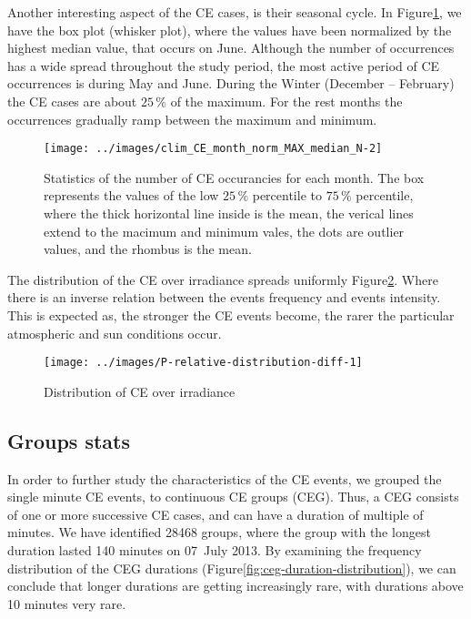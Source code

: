\documentclass[preprint, 3p,
authoryear]{elsarticle} %
\begin{document}
Another interesting aspect of the CE cases, is their seasonal cycle. In
Figure\nobreakspace{}\ref{fig:relative-month-occurancies}, we have the
box plot (whisker plot), where the values have been normalized by the
highest median value, that occurs on June. Although the number of
occurrences has a wide spread throughout the study period, the most
active period of CE occurrences is during May and June. During the
Winter (December -- February) the CE cases are about \(25\,\%\) of the
maximum. For the rest months the occurrences gradually ramp between the
maximum and minimum.

\begin{figure}

{\centering \texttt{[image: ../images/clim\_CE\_month\_norm\_MAX\_median\_N-2]} 

}

\caption{Statistics of the number of CE occurancies for each month. The box represents the values of the low $25\,\%$ percentile to $75\,\%$ percentile, where the thick horizontal line inside is the mean, the verical lines extend to the macimum and minimum vales, the dots are outlier values, and the rhombus is the mean.}\label{fig:relative-month-occurancies}
\end{figure}

The distribution of the CE over irradiance spreads uniformly
Figure\nobreakspace{}\ref{fig:ovir-distribution}. Where there is an
inverse relation between the events frequency and events intensity. This
is expected as, the stronger the CE events become, the rarer the
particular atmospheric and sun conditions occur.

\begin{figure}

{\centering \texttt{[image: ../images/P-relative-distribution-diff-1]} 

}

\caption{Distribution of CE over irradiance}\label{fig:ovir-distribution}
\end{figure}

\hypertarget{groups-stats}{%
\subsection{Groups stats}\label{groups-stats}}

In order to further study the characteristics of the CE events, we
grouped the single minute CE events, to continuous CE groups (CEG).
Thus, a CEG consists of one or more successive CE cases, and can have a
duration of multiple of minutes. We have identified 28468 groups, where
the group with the longest duration lasted 140 minutes on 07~July 2013.
By examining the frequency distribution of the CEG durations
(Figure\nobreakspace{}\ref{fig:ceg-duration-distribution}), we can
conclude that longer durations are getting increasingly rare, with
durations above 10 minutes very rare.
\end{document}
